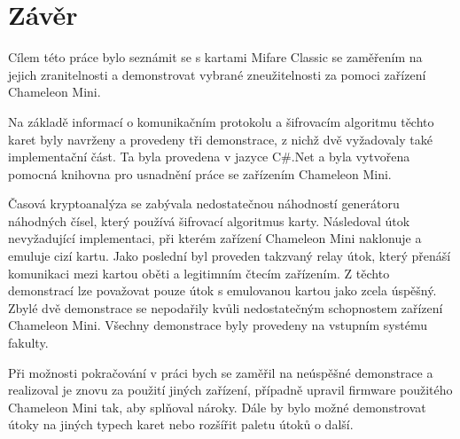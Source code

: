 \chapter{Závěr}
\label{zaver}
Cílem této práce bylo seznámit se s kartami Mifare Classic se zaměřením na jejich zranitelnosti a demonstrovat vybrané zneužitelnosti za pomoci zařízení Chameleon Mini. \par
Na základě informací o komunikačním protokolu a šifrovacím algoritmu těchto karet byly navrženy a provedeny tři demonstrace, z nichž dvě vyžadovaly také implementační část. Ta byla provedena v jazyce C\#.Net a byla vytvořena pomocná knihovna pro usnadnění práce se zařízením Chameleon Mini.\par
Časová kryptoanalýza se zabývala nedostatečnou náhodností generátoru náhodných čísel, který používá šifrovací algoritmus karty. Následoval útok nevyžadující implementaci, při kterém zařízení Chameleon Mini naklonuje a emuluje cizí kartu. Jako poslední byl proveden takzvaný relay útok, který přenáší komunikaci mezi kartou oběti a legitimním čtecím zařízením. Z těchto demonstrací lze považovat pouze útok s emulovanou kartou jako zcela úspěšný. Zbylé dvě demonstrace se nepodařily kvůli nedostatečným schopnostem zařízení Chameleon Mini. Všechny demonstrace byly provedeny na vstupním systému fakulty.\par
Při možnosti pokračování v práci bych se zaměřil na neúspěšné demonstrace a realizoval je znovu za použití jiných zařízení, případně upravil firmware použitého Chameleon Mini tak, aby splňoval nároky. Dále by bylo možné demonstrovat útoky na jiných typech karet nebo rozšířit paletu útoků o další.\par